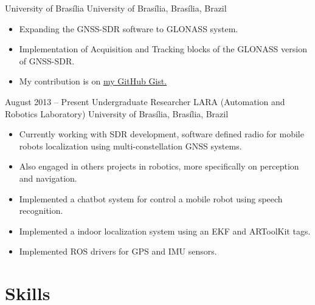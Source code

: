 \documentclass[letterpaper]{moderncv}        %
\begin{document}
{University of Brasília}
{University of Brasília, Brasília, Brazil}
{}
{\begin{itemize}%
	\item Expanding the GNSS-SDR software to GLONASS system.
	\item Implementation of Acquisition and Tracking blocks of the GLONASS version of GNSS-SDR.
	\item My contribution is on  \href{https://gist.github.com/Gastd/f46a2bd78dcc11984e69eb7cbc49f8a4}{my GitHub Gist.}
	\end{itemize}}
\cventry
{August 2013 -- Present}
{Undergraduate Researcher}
{LARA (Automation and Robotics Laboratory)}
{University of Brasília, Brasília, Brazil}
{}
{\begin{itemize}%
	\item Currently working with SDR development, software defined radio for mobile robots localization using multi-constellation GNSS systems.
	\item Also engaged in others projects in robotics, more specifically on perception and navigation.
	\item Implemented a \textquotedbl{}chatbot\textquotedbl{} system for control a mobile robot using speech recognition.
	\item Implemented a indoor localization system using an EKF and ARToolKit tags.
	\item Implemented ROS drivers for GPS and IMU sensors.
	\end{itemize}}

\section{Skills}


\ 
\end{document}
